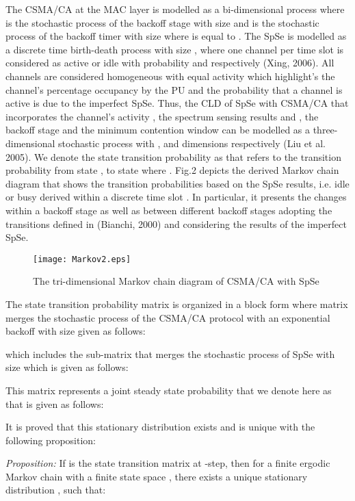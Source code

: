 \documentclass
[journal,11pt,draftclsnofoot,onecolumn,doublespace]{tETN2e}
\begin{document}
The CSMA/CA at the MAC layer is modelled as a bi-dimensional process  where  is the stochastic process of the backoff stage with size  and  is the stochastic process of the backoff timer with size  where  is equal to  \citep{bianchi00}. The SpSe is modelled as a discrete time birth-death process  with size , where one channel per time slot  is considered as active or idle with probability  and  respectively (Xing, 2006). All channels are considered homogeneous with equal activity  which highlight's the channel's percentage occupancy by the PU and the probability that a channel is active is  due to the imperfect SpSe. Thus, the CLD of SpSe with CSMA/CA that incorporates the channel’s activity , the spectrum sensing results  and , the backoff stage  and the minimum contention window  can be modelled as a three-dimensional stochastic process  with ,  and  dimensions respectively (Liu et al. 2005). We denote the state transition probability as  that refers to the transition probability from state  , to state   where .  Fig.2 depicts the derived Markov chain diagram that shows the transition probabilities based on the SpSe results, i.e. idle or busy derived within a discrete time slot . In particular, it presents the changes within a backoff stage as well as between different backoff stages adopting the transitions defined in (Bianchi, 2000) and considering the results of the imperfect SpSe.

\begin{figure}
\centering
  \texttt{[image: Markov2.eps]}\\
  \caption{The tri-dimensional Markov chain diagram of CSMA/CA with SpSe}
  \label{fig:fig2}
\end{figure}

The state transition probability matrix is organized in a block form where matrix  merges the stochastic process of the CSMA/CA protocol with an exponential backoff with  size given as follows:

which includes the sub-matrix  that merges the stochastic process of SpSe  with size  which is given as follows: 


This matrix represents a joint steady state probability that we denote here as  that is given as follows: 

It is proved that this stationary distribution exists and is unique with the following proposition:

\textit{Proposition:} If  is the state transition matrix at -step, then for a finite ergodic Markov chain with a finite state space , there exists a unique stationary distribution , such that:
\end{document}
